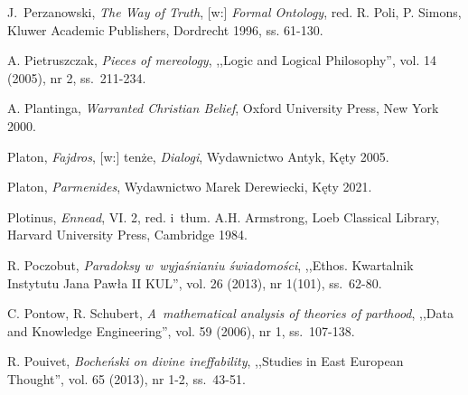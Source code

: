 \begin{thebibliography}{100}
J.~Perzanowski, \textit{The Way of Truth}, [w:] \textit{Formal Ontology}, red. R. Poli, P. Simons, Kluwer Academic Publishers, Dordrecht 1996, ss. 61-130.


A. Pietruszczak, \textit{Pieces of mereology}, ,,Logic and Logical Philosophy'', vol. 14 (2005), nr 2, ss.~211-234.


A. Plantinga, \textit{Warranted Christian Belief}, Oxford University Press, New York 2000.

Platon, \textit{Fajdros}, [w:] tenże, \textit{Dialogi}, Wydawnictwo Antyk, Kęty 2005.

Platon, \textit{Parmenides}, Wydawnictwo Marek Derewiecki, Kęty 2021.

Plotinus, \textit{Ennead}, VI. 2, red. i~tłum. A.H. Armstrong, Loeb Classical Library, Harvard University Press, Cambridge 1984.


R. Poczobut, \textit{Paradoksy w~wyjaśnianiu świadomości}, ,,Ethos. Kwartalnik Instytutu Jana Pawła II KUL'', vol. 26 (2013), nr 1(101), ss.~62-80.

C. Pontow, R. Schubert, \textit{A~mathematical analysis of theories of parthood}, ,,Data and Knowledge Engineering'', vol. 59 (2006), nr 1, ss.~107-138.


R. Pouivet, \textit{Bocheński on divine ineffability}, ,,Studies in East European Thought'', vol. 65 (2013), nr 1-2, ss.~43-51.


\end{thebibliography}
